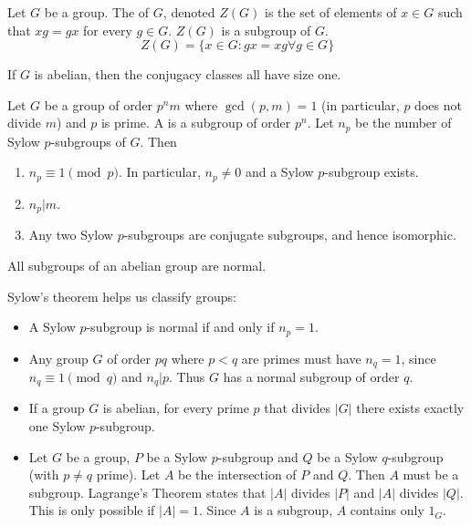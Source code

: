 \documentclass{article}
\begin{document}
\begin{defn}
  Let $G$ be a group. The  of $G$, denoted $Z(G)$ is the set of
  elements of $x \in G$ such that $xg = gx$ for every $g \in G$. $Z(G)$ is a subgroup
  of $G$. 
  $$Z(G) = \{x \in G : gx = xg \forall g \in G\}$$
\end{defn}

\begin{remark}
  If $G$ is abelian, then the conjugacy classes all have size one. 
\end{remark}

\begin{nthm}
  Let $G$ be a group of order $p^nm$ where $\gcd(p, m) = 1$ (in particular,
  $p$ does not divide $m$) and $p$ is prime. A  is
  a subgroup of order $p^n$. Let $n_p$ be the number of Sylow $p$-subgroups
  of $G$. Then
  \begin{enumerate}
  \item $n_p \equiv 1 \pmod{p}$. In particular, $n_p \neq 0$ and a Sylow $p$-subgroup exists.
  \item $n_p | m$.
  \item Any two Sylow $p$-subgroups are conjugate subgroups, and hence isomorphic.
  \end{enumerate}
\end{nthm}

\begin{remark}
  All subgroups of an abelian group are normal. 
\end{remark}

\begin{remark}
  Sylow's theorem helps us classify groups:
  \begin{itemize}
  \item A Sylow $p$-subgroup is normal if and only if $n_p = 1$.
  \item Any group $G$ of order $pq$ where $p < q$ are primes must have
    $n_q = 1$, since $n_q \equiv 1 \pmod{q}$ and $n_q | p$. Thus $G$
    has a normal subgroup of order $q$.
  \item If a group $G$ is abelian, for every prime $p$ that divides $|G|$ there
    exists exactly one Sylow $p$-subgroup.
  \item Let $G$ be a group, $P$ be a Sylow $p$-subgroup and $Q$ be a Sylow $q$-subgroup
    (with $p \neq q$ prime). Let $A$ be the intersection of $P$ and $Q$. Then $A$ must
    be a subgroup. Lagrange's Theorem states that $|A|$ divides $|P|$ and $|A|$ divides $|Q|$.
    This is only possible if $|A| = 1$. Since $A$ is a subgroup, $A$ contains only $1_G$.
  \end{itemize}
\end{remark}
\end{document}
